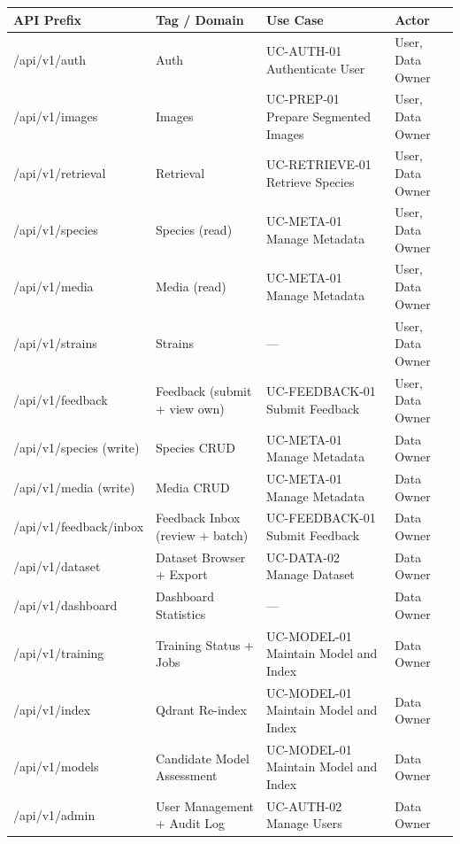 \begin{center}
\begin{tabular}{@{}p{3cm} p{4.5cm} p{3.5cm} p{4cm}@{}}
\toprule
\textbf{API Prefix} & \textbf{Tag / Domain} & \textbf{Use Case} & \textbf{Actor} \\
\midrule
/api/v1/auth & Auth & UC-AUTH-01 Authenticate User & User, Data Owner \\
/api/v1/images & Images & UC-PREP-01 Prepare Segmented Images & User, Data Owner \\
/api/v1/retrieval & Retrieval & UC-RETRIEVE-01 Retrieve Species & User, Data Owner \\
/api/v1/species & Species (read) & UC-META-01 Manage Metadata & User, Data Owner \\
/api/v1/media & Media (read) & UC-META-01 Manage Metadata & User, Data Owner \\
/api/v1/strains & Strains & --- & User, Data Owner \\
/api/v1/feedback & Feedback (submit + view own) & UC-FEEDBACK-01 Submit Feedback & User, Data Owner \\
\midrule
/api/v1/species (write) & Species CRUD & UC-META-01 Manage Metadata & Data Owner \\
/api/v1/media (write) & Media CRUD & UC-META-01 Manage Metadata & Data Owner \\
/api/v1/feedback/inbox & Feedback Inbox (review + batch) & UC-FEEDBACK-01 Submit Feedback & Data Owner \\
/api/v1/dataset & Dataset Browser + Export & UC-DATA-02 Manage Dataset & Data Owner \\
/api/v1/dashboard & Dashboard Statistics & --- & Data Owner \\
/api/v1/training & Training Status + Jobs & UC-MODEL-01 Maintain Model and Index & Data Owner \\
/api/v1/index & Qdrant Re-index & UC-MODEL-01 Maintain Model and Index & Data Owner \\
/api/v1/models & Candidate Model Assessment & UC-MODEL-01 Maintain Model and Index & Data Owner \\
/api/v1/admin & User Management + Audit Log & UC-AUTH-02 Manage Users & Data Owner \\
\bottomrule
\end{tabular}
\label{tab:ch03-api-map}
\end{center}

